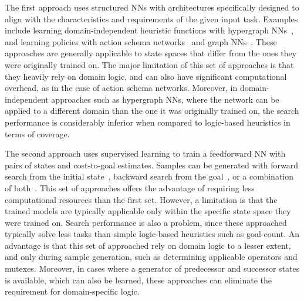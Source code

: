 \documentclass[ppgc,diss,english]{iiufrgs}
\newcommand{\pp}[2][noinline]{\todo[color=purple!50,linecolor={purple!100},#1,fancyline,author=Pedro]{#2}}
\begin{document}
The first approach uses structured NNs with architectures specifically designed to align with the characteristics and requirements of the given input task. Examples include learning domain-independent heuristic functions with hypergraph NNs~\cite{Shen.etal/2020}, and learning policies with action schema networks~\cite{Toyer.etal/2018,Toyer.etal/2020} and graph NNs~\cite{Stahlberg.etal/2022}. These approaches are generally applicable to state spaces that differ from the ones they were originally trained on. The major limitation of this set of approaches is that they heavily rely on domain logic, and can also have significant computational overhead, as in the case of action schema networks. Moreover, in domain-independent approaches such as hypergraph NNs, where the network can be applied to a different domain than the one it was originally trained on, the search performance is considerably inferior when compared to logic-based heuristics in terms of coverage. %

The second approach uses supervised learning to train a feedforward NN with pairs of states and cost-to-goal estimates. Samples can be generated with forward search from the initial state~\cite{Ferber.etal/2020a}, backward search from the goal~\cite{Yu.etal/2020,OToole/2022,Bettker.etal/2022}, or a combination of both~\cite{Ferber.etal/2022}.
This set of approaches offers the advantage of requiring less computational resources than the first set. However, a limitation is that the trained models are typically applicable only within the specific state space they were trained on. Search performance is also a problem, since these approached typically solve less tasks than simple logic-based heuristics such as goal-count. An advantage is that this set of approached rely on domain logic to a lesser extent, and only during sample generation, such as determining applicable operators and mutexes. Moreover, in cases where a generator of predecessor and successor states is available, which can also be learned, these approaches can eliminate the requirement for domain-specific logic.%

\end{document}
